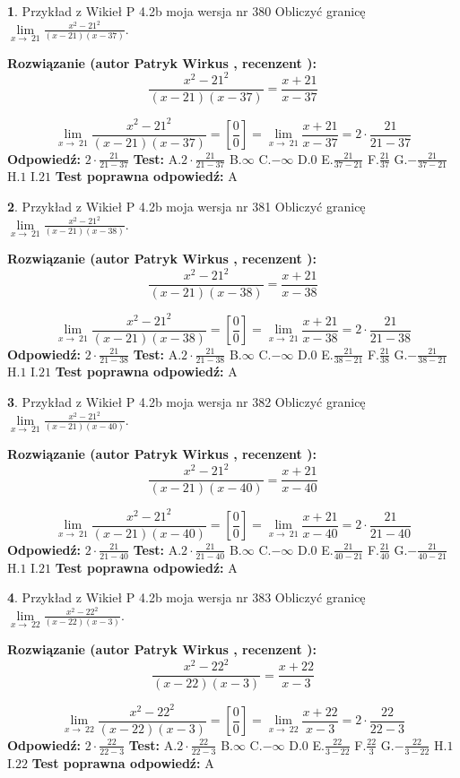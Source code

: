 \documentclass[12pt, a4paper]{article}
\theoremstyle{definition} %
\newtheorem{zad}{}
\newcommand{\zadStart}[1]{\begin{zad}#1\newline}
\newcommand{\zadStop}{\end{zad}}
\newcommand{\rozwStart}[2]{\noindent \textbf{Rozwiązanie (autor #1 , recenzent #2): }\newline}
\newcommand{\rozwStop}{\newline}
\newcommand{\odpStart}{\noindent \textbf{Odpowiedź:}\newline}
\newcommand{\odpStop}{\newline}
\newcommand{\testStart}{\noindent \textbf{Test:}\newline}
\newcommand{\testStop}{\newline}
\newcommand{\kluczStart}{\noindent \textbf{Test poprawna odpowiedź:}\newline}
\newcommand{\kluczStop}{\newline}
\begin{document}
\zadStart{Przykład z Wikieł P 4.2b moja wersja nr 380}
Obliczyć granicę $\lim\limits_{x\to\ 21}\frac{x^{2}-21^{2}}{(x-21)(x-37)}$.
\zadStop
\rozwStart{Patryk Wirkus}{}
$$\frac{x^{2}-21^{2}}{(x-21)(x-37)}=\frac{x+21}{x-37}$$

$$\lim\limits_{x\to\ 21}\frac{x^{2}-21^{2}}{(x-21)(x-37)}=[\frac{0}{0}]=\lim\limits_{x\to\ 21}\frac{x+21}{x-37}=2 \cdot \frac{21}{21-37}$$
\rozwStop
\odpStart
$2 \cdot \frac{21}{21-37}$
\odpStop
\testStart
A.$2 \cdot \frac{21}{21-37}$
B.$\infty$
C.$-\infty$
D.$0$
E.$\frac{21}{37-21}$
F.$\frac{21}{37}$
G.$-\frac{21}{37-21}$
H.$1$
I.$21$
\testStop
\kluczStart
A
\kluczStop



\zadStart{Przykład z Wikieł P 4.2b moja wersja nr 381}
Obliczyć granicę $\lim\limits_{x\to\ 21}\frac{x^{2}-21^{2}}{(x-21)(x-38)}$.
\zadStop
\rozwStart{Patryk Wirkus}{}
$$\frac{x^{2}-21^{2}}{(x-21)(x-38)}=\frac{x+21}{x-38}$$

$$\lim\limits_{x\to\ 21}\frac{x^{2}-21^{2}}{(x-21)(x-38)}=[\frac{0}{0}]=\lim\limits_{x\to\ 21}\frac{x+21}{x-38}=2 \cdot \frac{21}{21-38}$$
\rozwStop
\odpStart
$2 \cdot \frac{21}{21-38}$
\odpStop
\testStart
A.$2 \cdot \frac{21}{21-38}$
B.$\infty$
C.$-\infty$
D.$0$
E.$\frac{21}{38-21}$
F.$\frac{21}{38}$
G.$-\frac{21}{38-21}$
H.$1$
I.$21$
\testStop
\kluczStart
A
\kluczStop



\zadStart{Przykład z Wikieł P 4.2b moja wersja nr 382}
Obliczyć granicę $\lim\limits_{x\to\ 21}\frac{x^{2}-21^{2}}{(x-21)(x-40)}$.
\zadStop
\rozwStart{Patryk Wirkus}{}
$$\frac{x^{2}-21^{2}}{(x-21)(x-40)}=\frac{x+21}{x-40}$$

$$\lim\limits_{x\to\ 21}\frac{x^{2}-21^{2}}{(x-21)(x-40)}=[\frac{0}{0}]=\lim\limits_{x\to\ 21}\frac{x+21}{x-40}=2 \cdot \frac{21}{21-40}$$
\rozwStop
\odpStart
$2 \cdot \frac{21}{21-40}$
\odpStop
\testStart
A.$2 \cdot \frac{21}{21-40}$
B.$\infty$
C.$-\infty$
D.$0$
E.$\frac{21}{40-21}$
F.$\frac{21}{40}$
G.$-\frac{21}{40-21}$
H.$1$
I.$21$
\testStop
\kluczStart
A
\kluczStop



\zadStart{Przykład z Wikieł P 4.2b moja wersja nr 383}
Obliczyć granicę $\lim\limits_{x\to\ 22}\frac{x^{2}-22^{2}}{(x-22)(x-3)}$.
\zadStop
\rozwStart{Patryk Wirkus}{}
$$\frac{x^{2}-22^{2}}{(x-22)(x-3)}=\frac{x+22}{x-3}$$

$$\lim\limits_{x\to\ 22}\frac{x^{2}-22^{2}}{(x-22)(x-3)}=[\frac{0}{0}]=\lim\limits_{x\to\ 22}\frac{x+22}{x-3}=2 \cdot \frac{22}{22-3}$$
\rozwStop
\odpStart
$2 \cdot \frac{22}{22-3}$
\odpStop
\testStart
A.$2 \cdot \frac{22}{22-3}$
B.$\infty$
C.$-\infty$
D.$0$
E.$\frac{22}{3-22}$
F.$\frac{22}{3}$
G.$-\frac{22}{3-22}$
H.$1$
I.$22$
\testStop
\kluczStart
A
\kluczStop
\end{document}
